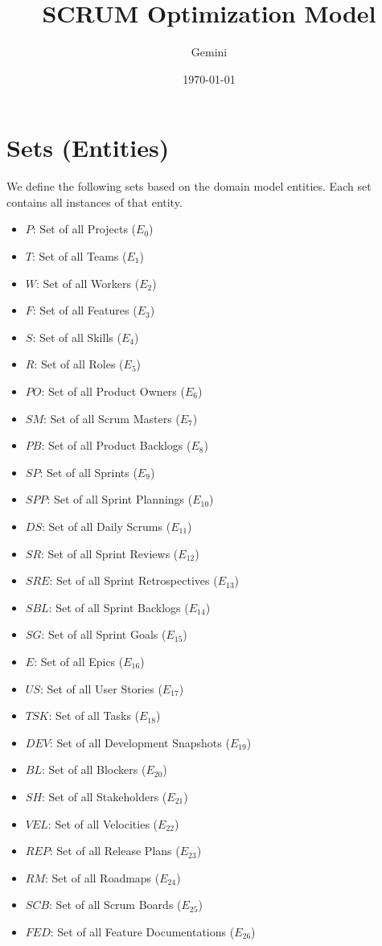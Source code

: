 \documentclass{article}
\title{SCRUM Optimization Model}
\author{Gemini}
\date{\today}
\begin{document}
\maketitle
\tableofcontents
\newpage

\section{Sets (Entities)}
We define the following sets based on the domain model entities. Each set contains all instances of that entity.
\begin{itemize}
    \item $P$: Set of all Projects ($E_0$)
    \item $T$: Set of all Teams ($E_1$)
    \item $W$: Set of all Workers ($E_2$)
    \item $F$: Set of all Features ($E_3$)
    \item $S$: Set of all Skills ($E_4$)
    \item $R$: Set of all Roles ($E_5$)
    \item $PO$: Set of all Product Owners ($E_6$)
    \item $SM$: Set of all Scrum Masters ($E_7$)
    \item $PB$: Set of all Product Backlogs ($E_8$)
    \item $SP$: Set of all Sprints ($E_9$)
    \item $SPP$: Set of all Sprint Plannings ($E_{10}$)
    \item $DS$: Set of all Daily Scrums ($E_{11}$)
    \item $SR$: Set of all Sprint Reviews ($E_{12}$)
    \item $SRE$: Set of all Sprint Retrospectives ($E_{13}$)
    \item $SBL$: Set of all Sprint Backlogs ($E_{14}$)
    \item $SG$: Set of all Sprint Goals ($E_{15}$)
    \item $E$: Set of all Epics ($E_{16}$)
    \item $US$: Set of all User Stories ($E_{17}$)
    \item $TSK$: Set of all Tasks ($E_{18}$)
    \item $DEV$: Set of all Development Snapshots ($E_{19}$)
    \item $BL$: Set of all Blockers ($E_{20}$)
    \item $SH$: Set of all Stakeholders ($E_{21}$)
    \item $VEL$: Set of all Velocities ($E_{22}$)
    \item $REP$: Set of all Release Plans ($E_{23}$)
    \item $RM$: Set of all Roadmaps ($E_{24}$)
    \item $SCB$: Set of all Scrum Boards ($E_{25}$)
    \item $FED$: Set of all Feature Documentations ($E_{26}$)
\end{itemize}
\end{document}
